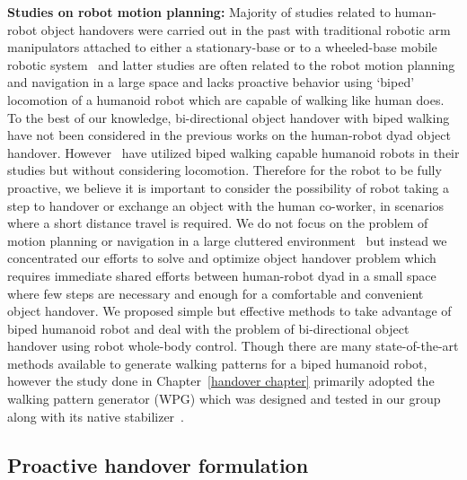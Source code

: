 \textbf{Studies on robot motion planning:} Majority of studies related to human-robot object handovers were carried out in the past with traditional robotic arm manipulators attached to either a stationary-base or to a wheeled-base mobile robotic system~\cite{medina2016human, vogt2018one, huber2008Indus, kupcsik2016learning, cakmak2011human} and latter studies are often related to the robot motion planning and navigation in a large space and lacks proactive behavior using `biped' locomotion of a humanoid robot which are capable of walking like human does. To the best of our knowledge, bi-directional object handover with biped walking have not been considered in the previous works on the human-robot dyad object handover. However~\cite{vezzani2017novel, chan2014implementation} have utilized biped walking capable humanoid robots in their studies but without considering locomotion. Therefore for the robot to be fully proactive, we believe it is important to consider the possibility of robot taking a step to handover or exchange an object with the human co-worker, in scenarios where a short distance travel is required. We do not focus on the problem of motion planning or navigation in a large cluttered environment~\cite{mainprice2012sharing, vahrenkamp2009humanoid, kim2004advanced} but instead we concentrated our efforts to solve and optimize object handover problem which requires immediate shared efforts between human-robot dyad in a small space where few steps are necessary and enough for a comfortable and convenient object handover. We proposed simple but effective methods to take advantage of biped humanoid robot and deal with the problem of bi-directional object handover using robot whole-body control. Though there are many state-of-the-art methods available to generate walking patterns for a biped humanoid robot, however the study done in Chapter~\ref{handover chapter} primarily adopted the walking pattern generator (WPG) which was designed and tested in our group~\cite{ kajita20013d, caron2016humanoids} along with its native stabilizer~\cite{kajita2010biped, caron2018stair}.



\subsection{Proactive handover formulation}

